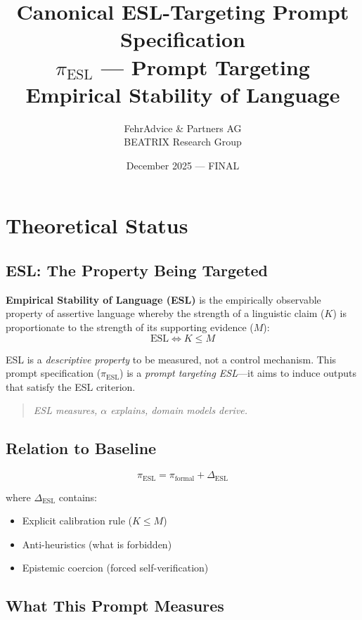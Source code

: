 \documentclass[11pt,a4paper]{article}
\title{\textbf{Canonical ESL-Targeting Prompt Specification}\\
\Large $\pi_{\text{ESL}}$ --- Prompt Targeting Empirical Stability of Language}
\author{FehrAdvice \& Partners AG\\BEATRIX Research Group}
\date{December 2025 --- FINAL}
\begin{document}
\maketitle

\section{Theoretical Status}

\subsection{ESL: The Property Being Targeted}

\textbf{Empirical Stability of Language (ESL)} is the empirically observable property of assertive language whereby the strength of a linguistic claim ($K$) is proportionate to the strength of its supporting evidence ($M$):
\[
\text{ESL} \iff K \le M
\]

ESL is a \emph{descriptive property} to be measured, not a control mechanism. This prompt specification ($\pi_{\text{ESL}}$) is a \emph{prompt targeting ESL}---it aims to induce outputs that satisfy the ESL criterion.

\begin{quote}
\emph{ESL measures, $\alpha$ explains, domain models derive.}
\end{quote}

\subsection{Relation to Baseline}

\begin{equation}
\pi_{\text{ESL}} = \pi_{\text{formal}} + \Delta_{\text{ESL}}
\end{equation}

where $\Delta_{\text{ESL}}$ contains:
\begin{itemize}
    \item Explicit calibration rule ($K \leq M$)
    \item Anti-heuristics (what is forbidden)
    \item Epistemic coercion (forced self-verification)
\end{itemize}

\subsection{What This Prompt Measures}
\end{document}
